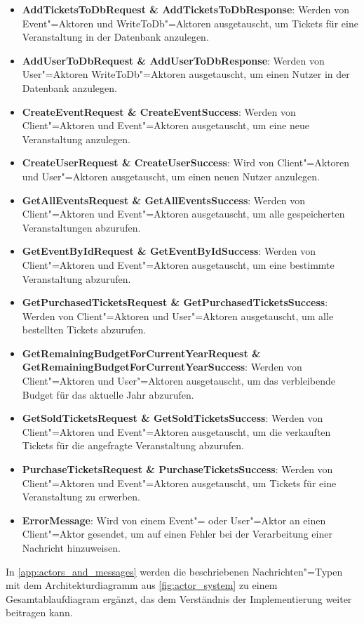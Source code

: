 \begin{itemize}[itemsep=-.5em,leftmargin=*]
    \item \textbf{AddTicketsToDbRequest \& AddTicketsToDbResponse}: Werden von Event"=Aktoren und WriteToDb"=Aktoren ausgetauscht, um Tickets für eine Veranstaltung in der Datenbank anzulegen.
    \item \textbf{AddUserToDbRequest \& AddUserToDbResponse}: Werden von User"=Aktoren WriteToDb"=Aktoren ausgetauscht, um einen Nutzer in der Datenbank anzulegen.
    \item \textbf{CreateEventRequest \& CreateEventSuccess}:  Werden von Client"=Aktoren und Event"=Aktoren ausgetauscht, um eine neue Veranstaltung anzulegen.
    \item \textbf{CreateUserRequest \& CreateUserSuccess}: Wird von Client"=Aktoren und User"=Aktoren ausgetauscht, um einen neuen Nutzer anzulegen.
    \item \textbf{GetAllEventsRequest \& GetAllEventsSuccess}: Werden von Client"=Aktoren und Event"=Aktoren ausgetauscht, um alle gespeicherten Veranstaltungen abzurufen.
    \item \textbf{GetEventByIdRequest \& GetEventByIdSuccess}: Werden von Client"=Aktoren und Event"=Aktoren ausgetauscht, um eine bestimmte Veranstaltung abzurufen.
    \item \textbf{GetPurchasedTicketsRequest \& GetPurchasedTicketsSuccess}: Werden von Client"=Aktoren und User"=Aktoren ausgetauscht, um alle bestellten Tickets abzurufen.
    \item \textbf{GetRemainingBudgetForCurrentYearRequest \& GetRemainingBudgetForCurrentYearSuccess}: Werden von Client"=Aktoren und User"=Aktoren ausgetauscht, um das verbleibende Budget für das aktuelle Jahr abzurufen.
    \item \textbf{GetSoldTicketsRequest \& GetSoldTicketsSuccess}: Werden von Client"=Aktoren und Event"=Aktoren ausgetauscht, um die verkauften Tickets für die angefragte Veranstaltung abzurufen.
    \item \textbf{PurchaseTicketsRequest \& PurchaseTicketsSuccess}: Werden von Client"=Aktoren und Event"=Aktoren ausgetauscht, um Tickets für eine Veranstaltung zu erwerben.
    \item \textbf{ErrorMessage}: Wird von einem Event"= oder User"=Aktor an einen Client"=Aktor gesendet, um auf einen Fehler bei der Verarbeitung einer Nachricht hinzuweisen.
\end{itemize}

In \autoref{app:actors_and_messages} werden die beschriebenen Nachrichten"=Typen mit dem Architekturdiagramm aus \autoref{fig:actor_system} zu einem Gesamtablaufdiagram ergänzt, das dem Verständnis der Implementierung weiter beitragen kann.

